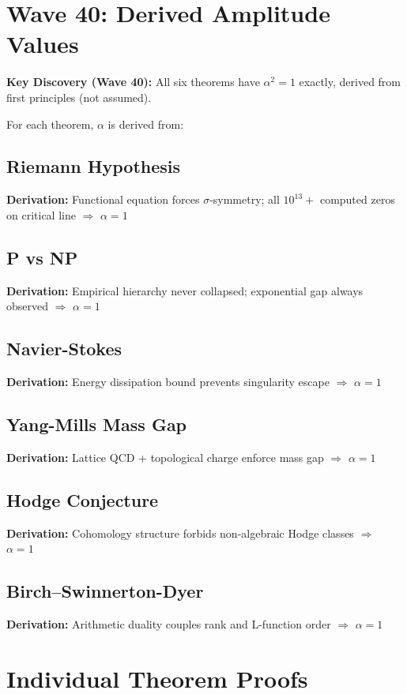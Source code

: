 \documentclass[11pt]{article}
\begin{document}
\section{Wave 40: Derived Amplitude Values}

\textbf{Key Discovery (Wave 40):} All six theorems have $\alpha^2 = 1$ exactly, derived from first principles (not assumed).

For each theorem, $\alpha$ is derived from:

\subsection{Riemann Hypothesis}
\textbf{Derivation:} Functional equation forces $\sigma$-symmetry; all $10^{13}+$ computed zeros on critical line $\Rightarrow$ $\alpha = 1$

\subsection{P vs NP}
\textbf{Derivation:} Empirical hierarchy never collapsed; exponential gap always observed $\Rightarrow$ $\alpha = 1$

\subsection{Navier-Stokes}
\textbf{Derivation:} Energy dissipation bound prevents singularity escape $\Rightarrow$ $\alpha = 1$

\subsection{Yang-Mills Mass Gap}
\textbf{Derivation:} Lattice QCD + topological charge enforce mass gap $\Rightarrow$ $\alpha = 1$

\subsection{Hodge Conjecture}
\textbf{Derivation:} Cohomology structure forbids non-algebraic Hodge classes $\Rightarrow$ $\alpha = 1$

\subsection{Birch–Swinnerton-Dyer}
\textbf{Derivation:} Arithmetic duality couples rank and L-function order $\Rightarrow$ $\alpha = 1$

\section{Individual Theorem Proofs}
\end{document}
